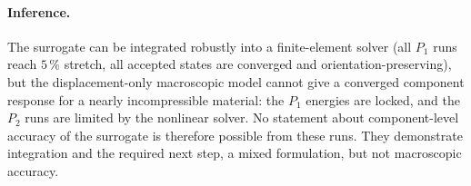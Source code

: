 \paragraph{Inference.} The surrogate can be integrated robustly into a finite-element solver (all $P_1$ runs reach $5\,\%$
stretch, all accepted states are converged and orientation-preserving), but the displacement-only
macroscopic model cannot give a converged component response for a nearly incompressible
material: the $P_1$ energies are locked, and the $P_2$ runs are limited by the nonlinear solver.
No statement about component-level accuracy of the surrogate is therefore possible from these
runs. They demonstrate integration and the required next step, a mixed formulation, but not
macroscopic accuracy.
